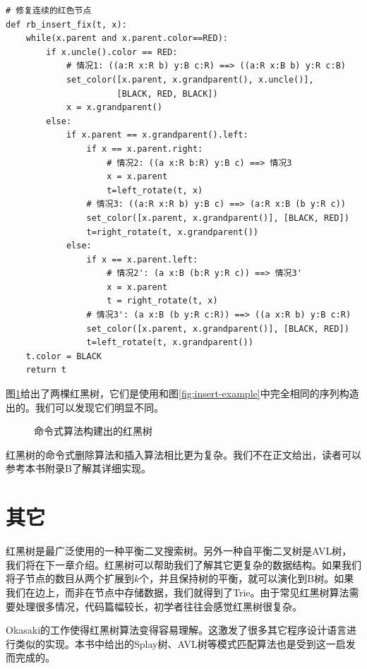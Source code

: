 \documentclass{ctexart}
\begin{document}
\lstset{language=Python}
\begin{lstlisting}
# 修复连续的红色节点
def rb_insert_fix(t, x):
    while(x.parent and x.parent.color==RED):
        if x.uncle().color == RED:
            # 情况1: ((a:R x:R b) y:B c:R) ==> ((a:R x:B b) y:R c:B)
            set_color([x.parent, x.grandparent(), x.uncle()],
                      [BLACK, RED, BLACK])
            x = x.grandparent()
        else:
            if x.parent == x.grandparent().left:
                if x == x.parent.right:
                    # 情况2: ((a x:R b:R) y:B c) ==> 情况3
                    x = x.parent
                    t=left_rotate(t, x)
                # 情况3: ((a:R x:R b) y:B c) ==> (a:R x:B (b y:R c))
                set_color([x.parent, x.grandparent()], [BLACK, RED])
                t=right_rotate(t, x.grandparent())
            else:
                if x == x.parent.left:
                    # 情况2': (a x:B (b:R y:R c)) ==> 情况3'
                    x = x.parent
                    t = right_rotate(t, x)
                # 情况3': (a x:B (b y:R c:R)) ==> ((a x:R b) y:B c:R)
                set_color([x.parent, x.grandparent()], [BLACK, RED])
                t=left_rotate(t, x.grandparent())
    t.color = BLACK
    return t
\end{lstlisting}

图\ref{fig:imperative-insert}给出了两棵红黑树，它们是使用和图\ref{fig:insert-example}中完全相同的序列构造出的。我们可以发现它们明显不同。

\begin{figure}[htbp]
   \centering
   \caption{命令式算法构建出的红黑树}
   \label{fig:imperative-insert}
\end{figure}

红黑树的命令式删除算法和插入算法相比更为复杂。我们不在正文给出，读者可以参考本书附录B了解其详细实现。

\section{其它}
红黑树是最广泛使用的一种平衡二叉搜索树。另外一种自平衡二叉树是AVL树，我们将在下一章介绍。红黑树可以帮助我们了解其它更复杂的数据结构。如果我们将子节点的数目从两个扩展到$k$个，并且保持树的平衡，就可以演化到B树。如果我们在边上，而非在节点中存储数据，我们就得到了Trie。由于常见红黑树算法需要处理很多情况，代码篇幅较长，初学者往往会感觉红黑树很复杂。

Okasaki的工作使得红黑树算法变得容易理解。这激发了很多其它程序设计语言进行类似的实现\cite{rosetta}。本书中给出的Splay树、AVL树等模式匹配算法也是受到这一启发而完成的。
\end{document}
